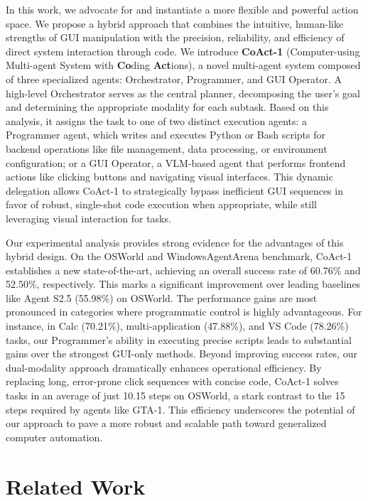 \documentclass{article} %
\newcommand{\ours}{CoAct-1\xspace}
\begin{document}
In this work, we advocate for and instantiate a more flexible and powerful action space. We propose a hybrid approach that combines the intuitive, human-like strengths of GUI manipulation with the precision, reliability, and efficiency of direct system interaction through code. We introduce \textbf{\ours} (Computer-using Multi-agent System with \textbf{Co}ding \textbf{Act}ions), a novel multi-agent system composed of three specialized agents: Orchestrator, Programmer, and GUI Operator. A high-level Orchestrator serves as the central planner, decomposing the user's goal and determining the appropriate modality for each subtask. Based on this analysis, it assigns the task to one of two distinct execution agents: a Programmer agent, which writes and executes Python or Bash scripts for backend operations like file management, data processing, or environment configuration; or a GUI Operator, a VLM-based agent that performs frontend actions like clicking buttons and navigating visual interfaces. This dynamic delegation allows \ours to strategically bypass inefficient GUI sequences in favor of robust, single-shot code execution when appropriate, while still leveraging visual interaction for tasks.

Our experimental analysis provides strong evidence for the advantages of this hybrid design. On the OSWorld and WindowsAgentArena benchmark, \ours establishes a new state-of-the-art, achieving an overall success rate of 60.76\% and 52.50\%, respectively. This marks a significant improvement over leading baselines like Agent S2.5 (55.98\%) on OSWorld. The performance gains are most pronounced in categories where programmatic control is highly advantageous. For instance, in Calc (70.21\%), multi-application (47.88\%), and VS Code (78.26\%) tasks, our Programmer's ability in executing precise scripts leads to substantial gains over the strongest GUI-only methods. Beyond improving success rates, our dual-modality approach dramatically enhances operational efficiency. By replacing long, error-prone click sequences with concise code, \ours solves tasks in an average of just 10.15 steps on OSWorld, a stark contrast to the 15 steps required by agents like GTA-1. This efficiency underscores the potential of our approach to pave a more robust and scalable path toward generalized computer automation.

\section{Related Work}
\label{sec:related-work}
\end{document}
